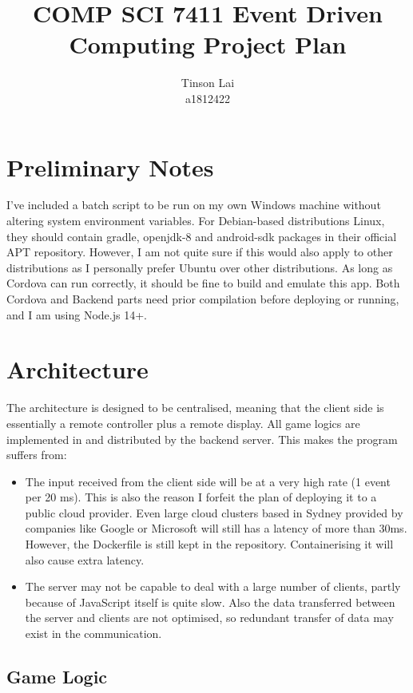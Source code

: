 \documentclass[12pt]{article}
\title{COMP SCI 7411 Event Driven Computing Project Plan}
\author{Tinson Lai \\ a1812422}
\date{}
\begin{document}
\maketitle

\section{Preliminary Notes}

I've included a batch script to be run on my own Windows machine without altering system environment variables. For Debian-based distributions Linux, they should contain gradle, openjdk-8 and android-sdk packages in their official APT repository. However, I am not quite sure if this would also apply to other distributions as I personally prefer Ubuntu over other distributions. As long as Cordova can run correctly, it should be fine to build and emulate this app. Both Cordova and Backend parts need prior compilation before deploying or running, and I am using Node.js 14+.

\section{Architecture}

The architecture is designed to be centralised, meaning that the client side is essentially a remote controller plus a remote display. All game logics are implemented in and distributed by the backend server. This makes the program suffers from:

\begin{itemize}
  \item The input received from the client side will be at a very high rate (1 event per 20 ms). This is also the reason I forfeit the plan of deploying it to a public cloud provider. Even large cloud clusters based in Sydney provided by companies like Google or Microsoft will still has a latency of more than 30ms. However, the Dockerfile is still kept in the repository. Containerising it will also cause extra latency.
  \item The server may not be capable to deal with a large number of clients, partly because of JavaScript itself is quite slow. Also the data transferred between the server and clients are not optimised, so redundant transfer of data may exist in the communication.
\end{itemize}

\subsection{Game Logic}
\end{document}
